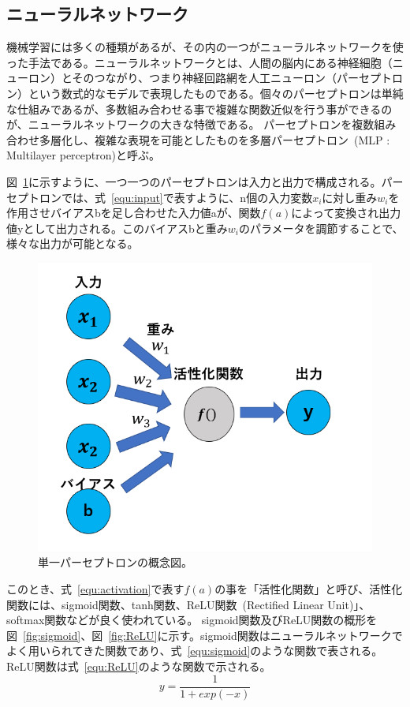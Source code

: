 \subsection{ニューラルネットワーク}
機械学習には多くの種類があるが、その内の一つがニューラルネットワークを使った手法である。ニューラルネットワークとは、人間の脳内にある神経細胞（ニューロン）とそのつながり、つまり神経回路網を人工ニューロン（パーセプトロン）という数式的なモデルで表現したものである。個々のパーセプトロンは単純な仕組みであるが、多数組み合わせる事で複雑な関数近似を行う事ができるのが、ニューラルネットワークの大きな特徴である。
パーセプトロンを複数組み合わせ多層化し、複雑な表現を可能としたものを多層パーセプトロン~(MLP : Multilayer perceptron)と呼ぶ。

図~\ref{fig:perce}に示すように、一つ一つのパーセプトロンは入力と出力で構成される。パーセプトロンでは、式~\eqref{equ:input}で表すように、n個の入力変数$x_i$に対し重み$w_i$を作用させバイアスbを足し合わせた入力値aが、関数$f(a)$によって変換され出力値yとして出力される。このバイアスbと重み$w_i$のパラメータを調節することで、様々な出力が可能となる。
\begin{figure}[tb]
  \centering
  \includegraphics[clip, width=13cm]{fig/4/parceptron.png}
  \caption{単一パーセプトロンの概念図。}
  \label{fig:perce}
\end{figure}
このとき、式~\eqref{equ:activation}で表す$f(a)$の事を「活性化関数」と呼び、活性化関数には、sigmoid関数、tanh関数、ReLU関数~(Rectified Linear Unit)」、softmax関数などが良く使われている。
sigmoid関数及びReLU関数の概形を図~\ref{fig:sigmoid}、図~\ref{fig:ReLU}に示す。sigmoid関数はニューラルネットワークでよく用いられてきた関数であり、式~\eqref{equ:sigmoid}のような関数で表される。ReLU関数は式~\eqref{equ:ReLU}のような関数で示される。
\begin{equation}
    y = \frac{1}{1+exp(-x)}
    \label{equ:sigmoid}
\end{equation}

